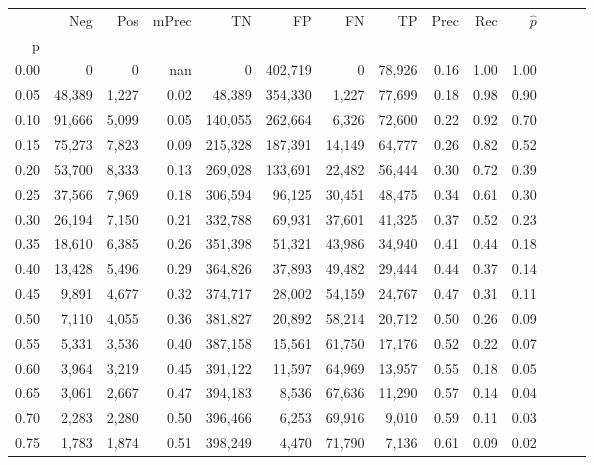 \begin{tabular}{rrrrrrrrrrrrrr}
\toprule
{} &     Neg &    Pos & mPrec &       TN &       FP &      FN &      TP &  Prec &   Rec & $\hat{p}$ \\
p    &         &        &       &          &          &         &         &       &       &           \\
\midrule
0.00 &       0 &      0 &   nan &        0 &  402,719 &       0 &  78,926 &  0.16 &  1.00 &      1.00 \\
0.05 &  48,389 &  1,227 &  0.02 &   48,389 &  354,330 &   1,227 &  77,699 &  0.18 &  0.98 &      0.90 \\
0.10 &  91,666 &  5,099 &  0.05 &  140,055 &  262,664 &   6,326 &  72,600 &  0.22 &  0.92 &      0.70 \\
0.15 &  75,273 &  7,823 &  0.09 &  215,328 &  187,391 &  14,149 &  64,777 &  0.26 &  0.82 &      0.52 \\
0.20 &  53,700 &  8,333 &  0.13 &  269,028 &  133,691 &  22,482 &  56,444 &  0.30 &  0.72 &      0.39 \\
0.25 &  37,566 &  7,969 &  0.18 &  306,594 &   96,125 &  30,451 &  48,475 &  0.34 &  0.61 &      0.30 \\
0.30 &  26,194 &  7,150 &  0.21 &  332,788 &   69,931 &  37,601 &  41,325 &  0.37 &  0.52 &      0.23 \\
0.35 &  18,610 &  6,385 &  0.26 &  351,398 &   51,321 &  43,986 &  34,940 &  0.41 &  0.44 &      0.18 \\
0.40 &  13,428 &  5,496 &  0.29 &  364,826 &   37,893 &  49,482 &  29,444 &  0.44 &  0.37 &      0.14 \\
0.45 &   9,891 &  4,677 &  0.32 &  374,717 &   28,002 &  54,159 &  24,767 &  0.47 &  0.31 &      0.11 \\
0.50 &   7,110 &  4,055 &  0.36 &  381,827 &   20,892 &  58,214 &  20,712 &  0.50 &  0.26 &      0.09 \\
0.55 &   5,331 &  3,536 &  0.40 &  387,158 &   15,561 &  61,750 &  17,176 &  0.52 &  0.22 &      0.07 \\
0.60 &   3,964 &  3,219 &  0.45 &  391,122 &   11,597 &  64,969 &  13,957 &  0.55 &  0.18 &      0.05 \\
0.65 &   3,061 &  2,667 &  0.47 &  394,183 &    8,536 &  67,636 &  11,290 &  0.57 &  0.14 &      0.04 \\
0.70 &   2,283 &  2,280 &  0.50 &  396,466 &    6,253 &  69,916 &   9,010 &  0.59 &  0.11 &      0.03 \\
0.75 &   1,783 &  1,874 &  0.51 &  398,249 &    4,470 &  71,790 &   7,136 &  0.61 &  0.09 &      0.02 \\

\end{tabular}
